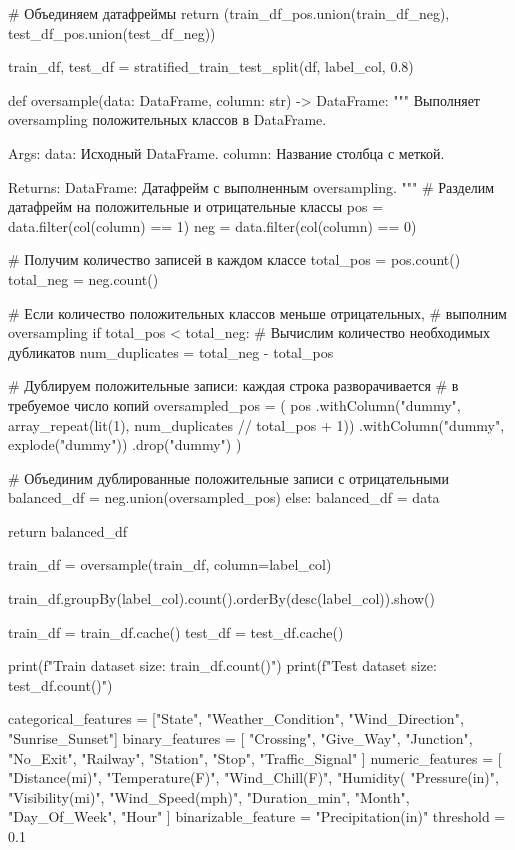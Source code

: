 \begin{code}
    # Объединяем датафреймы
    return (train_df_pos.union(train_df_neg),
            test_df_pos.union(test_df_neg))

train_df, test_df = stratified_train_test_split(df, label_col, 0.8)

def oversample(data: DataFrame, column: str) -> DataFrame:
    """
    Выполняет oversampling положительных классов в DataFrame.

    Args:
        data: Исходный DataFrame.
        column: Название столбца с меткой.

    Returns:
        DataFrame: Датафрейм с выполненным oversampling.
    """
    # Разделим датафрейм на положительные и отрицательные классы
    pos = data.filter(col(column) == 1)
    neg = data.filter(col(column) == 0)

    # Получим количество записей в каждом классе
    total_pos = pos.count()
    total_neg = neg.count()

    # Если количество положительных классов меньше отрицательных,
    # выполним oversampling
    if total_pos < total_neg:
        # Вычислим количество необходимых дубликатов
        num_duplicates = total_neg - total_pos

        # Дублируем положительные записи: каждая строка разворачивается
        # в требуемое число копий
        oversampled_pos = (
            pos
            .withColumn("dummy", array_repeat(lit(1),
                                              num_duplicates // total_pos + 1))
            .withColumn("dummy", explode("dummy"))
            .drop("dummy")
        )

        # Объединим дублированные положительные записи с отрицательными
        balanced_df = neg.union(oversampled_pos)
    else:
        balanced_df = data

    return balanced_df

train_df = oversample(train_df, column=label_col)

train_df.groupBy(label_col).count().orderBy(desc(label_col)).show()

train_df = train_df.cache()
test_df = test_df.cache()

print(f"Train dataset size: {train_df.count()}")
print(f"Test  dataset size: {test_df.count()}")

categorical_features = ["State", "Weather_Condition",
                      "Wind_Direction", "Sunrise_Sunset"]
binary_features = [
    "Crossing", "Give_Way", "Junction", "No_Exit",
    "Railway", "Station", "Stop", "Traffic_Signal"
]
numeric_features = [
    "Distance(mi)", "Temperature(F)", "Wind_Chill(F)", "Humidity(%
    "Pressure(in)", "Visibility(mi)", "Wind_Speed(mph)", "Duration_min",
    "Month", "Day_Of_Week", "Hour"
]
binarizable_feature = "Precipitation(in)"
threshold = 0.1


\end{code}
